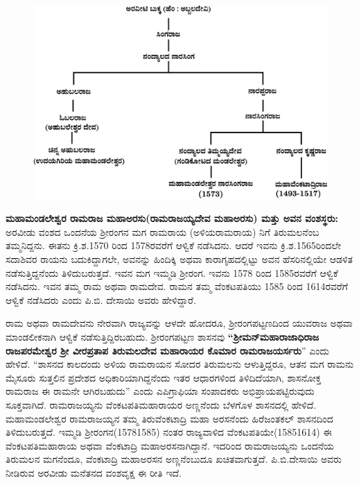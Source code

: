 \begin{figure}[H]
\includegraphics[scale=1.2]{images/chap3/chap3fig41.jpeg}
\end{figure}

\textbf{ಮಹಾಮಂಡಲೇಶ್ವರ ರಾಮರಾಜ ಮಹಾಅರಸು(ರಾಮರಾಜಯ್ಯದೇವ ಮಹಾಅರಸು) ಮತ್ತು ಅವನ ವಂಶಸ್ಥರು:} ಅರವೀಡು ವಂಶದ ಒಂದನೆಯ ಶ‍್ರೀರಂಗನ ಮಗ ರಾಮರಾಯ (ಅಳಿಯರಾಮರಾಯ) ನಿಗೆ ತಿರುಮಲನೆಂಬ ತಮ್ಮನಿದ್ದನು. ಈತನು ಕ್ರಿ.ಶ.1570 ರಿಂದ 1578ರವರೆಗೆ ಆಳ್ವಿಕೆ ನಡೆಸಿದನು. ಆದರೆ ಇವನು ಕ್ರಿ.ಶ.1565ರಿಂದಲೇ ಸದಾಶಿವರ ರಾಯನು ಬದುಕಿದ್ದಾಗಲೇ, ಅವನನ್ನು ಹಿಂದಿಕ್ಕಿ ಅಥವಾ ಕಾರಾಗೃಹದಲ್ಲಿಟ್ಟು ಅವನ ಹೆಸರಿನಲ್ಲಿಯೇ ಆಡಳಿತ ನಡೆಸುತ್ತಿದ್ದನೆಂದು ತಿಳಿದುಬರುತ್ತದೆ. ಇವನ ಮಗ ಇಮ್ಮಡಿ ಶ‍್ರೀರಂಗ. ಇವನು 1578 ರಿಂದ 1585ರವರೆಗೆ ಆಳ್ವಿಕೆ ನಡೆಸಿದನು. ಇವನ ತಮ್ಮ ರಾಮ ಅಥವಾ ರಾಮದೇವ. ರಾಮನ ತಮ್ಮ ವೆಂಕಟಪತಿಯು 1585 ರಿಂದ 1614ರವರೆಗೆ ಆಳ್ವಿಕೆ ನಡೆಸಿದರು ಎಂದು ಪಿ.ಬಿ. ದೇಸಾಯಿ ಅವರು ಹೇಳಿದ್ದಾರೆ.

ರಾಮ ಅಥವಾ ರಾಮದೇವನು ನೇರವಾಗಿ ರಾಜ್ಯವನ್ನು ಆಳದೇ ಹೋದರೂ, ಶ‍್ರೀರಂಗಪಟ್ಟಣದಿಂದ ಯುವರಾಜ ಅಥವಾ ಮಾಂಡಲೀಕನಾಗಿ ಆಳ್ವಿಕೆ ನಡೆಸುತ್ತಿದ್ದಿರಬಹುದು. ಶ‍್ರೀರಂಗಪಟ್ಟಣ ಶಾಸನವು \textbf{“ಶ‍್ರೀಮನ್​ ಮಹಾರಾಜಾಧಿರಾಜ ರಾಜಪರಮೇಶ್ವರ ಶ‍್ರೀ ವೀರಪ್ರತಾಪ ತಿರುಮಲದೇವ ಮಹಾರಾಯರ ಕೊಮಾರ ರಾಮರಾಜಯರ್ಸರು}” ಎಂದು ಹೇಳಿದೆ. “ಶಾಸನದ ಕಾಲದಂದು ಅಳಿಯ ರಾಮರಾಯನ ಸೋದರ ತಿರುಮಲನು ಆಳುತ್ತಿದ್ದರೂ, ಆತನ ಮಗ ರಾಮನು ಮೈಸೂರು ಸುತ್ತಲಿನ ಪ್ರದೇಶದ ಅಧಿಕಾರಿಯಾಗಿದ್ದನೆಂದು ಇತರ ಆಧಾರಗಳಿಂದ ತಿಳಿದಿದೆಯಾಗಿ, ಶಾಸನೋಕ್ತ ರಾಮರಾಜ ಈ ರಾಮನೇ ಆಗಿರಬಹುದು” ಎಂದು ಎಪಿಗ್ರಾಫಿಯಾ ಸಂಪಾದಕರು ಅಭಿಪ್ರಾಯಪಟ್ಟಿರುವುದು ಸೂಕ್ತವಾಗಿದೆ. ರಾಮರಾಜಯ್ಯನು ವೆಂಕಟಪತಿಮಹಾರಾಯರ ಅಣ್ಣನೆಂದು ಬೆಳಗೊಳ ಶಾಸನದಲ್ಲಿ ಹೇಳಿದೆ. ಮಹಾಮಂಡಲೇಶ್ವರ ರಾಮರಾಜಯ್ಯನ ತಮ್ಮ ತಿರುವೆಂಕಟಾದ್ರಿ ಮಹಾ ಅರಸನೆಂದು ಹಿರೆಜಂತಕಲ್​ ಶಾಸನದಿಂದ ತಿಳಿದುಬರುತ್ತದೆ. ಇಮ್ಮಡಿ ಶ‍್ರೀರಂಗನ(1578\enginline{-}1585) ನಂತರ ರಾಜ್ಯವಾಳಿದ ವೆಂಕಟಪತಿಯೇ(1585\enginline{-}1614) ಈ ವೆಂಕಟಪತಿಮಹಾರಾಯ ಅಥವಾ ವೆಂಕಟಾದ್ರಿ ಮಹಾಅರಸ\-ನಾಗಿದ್ದಾನೆ. ಇದರಿಂದ ರಾಮರಾಜಯ್ಯನು ಒಂದನೆಯ ತಿರುಮಲನ ಮಗನೆಂದೂ, ವೆಂಕಟಾದ್ರಿ ಮಹಾಅರಸನ ಅಣ್ಣ\-ನೆಂಬುದೂ ಖಚಿತವಾಗುತ್ತದೆ. ಪಿ.ಬಿ.ದೇಸಾಯಿ ಅವರು ನೀಡಿರುವ ಅರವೀಡು ಮನೆತನದ ವಂಶವೃಕ್ಷ ಈ ರೀತಿ ಇದೆ.

